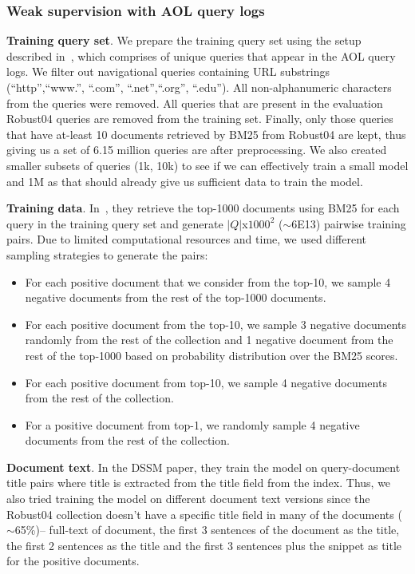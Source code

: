 \subsubsection{Weak supervision with AOL query logs}

\textbf{Training query set}. We prepare the training query set using the setup described in~\cite{Dehghani_sigir17}, which comprises of unique queries that appear in the AOL query logs. We filter out navigational queries containing URL substrings (``http'',``www.'', ``.com'', ``.net'',``.org'', ``.edu''). All non-alphanumeric characters from the queries were removed. All queries that are present in the evaluation Robust04 queries are removed from the training set. Finally, only those queries that have at-least 10 documents retrieved by BM25 from Robust04 are kept, thus giving us a set of 6.15 million queries are after preprocessing. We also created smaller subsets of queries (1k, 10k) to see if we can effectively train a small model and 1M as that should already give us sufficient data to train the model.

\textbf{Training data}. In~\cite{Dehghani_sigir17}, they retrieve the top-1000 documents using BM25 for each query in the training query set and generate $|Q|$x$1000^2$ ($\sim$6E13) pairwise training pairs. Due to limited computational resources and time, we used different sampling strategies to generate the pairs:
\begin{itemize}
    \item For each positive document that we consider from the top-10, we sample 4 negative documents from the rest of the top-1000 documents.
    \item For each positive document from the top-10, we sample 3 negative documents randomly from the rest of the collection and 1 negative document from the rest of the top-1000 based on probability distribution over the BM25 scores.
    \item For each positive document from top-10, we sample 4 negative documents from the rest of the collection.
    \item For a positive document from top-1, we randomly sample 4 negative documents from the rest of the collection.
\end{itemize}

\textbf{Document text}. In the DSSM paper, they train the model on query-document title pairs where title is extracted from the title field from the index. Thus, we also tried training the model on different document text versions since the Robust04 collection doesn't have a specific title field in many of the documents ($\sim$65\%)-- full-text of document, the first 3 sentences of the document as the title, the first 2 sentences as the title and the first 3 sentences plus the snippet as title for the positive documents.

